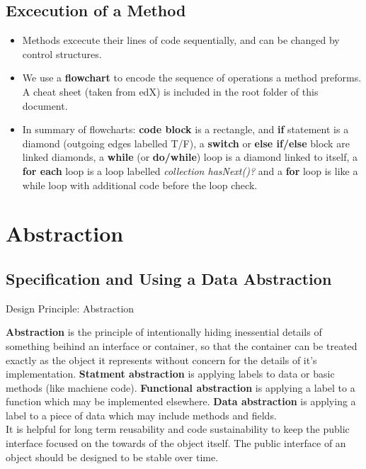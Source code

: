 \documentclass[letterpaper] {article}
\begin{document}
    \subsection{Excecution of a Method}
    \begin{itemize}
        \item Methods excecute their lines of code sequentially, and can be changed by control structures.
        \item We use a \textbf{flowchart} to encode the sequence of operations a method preforms. A cheat sheet (taken from edX) is included in the root folder of this document. 
        \item In summary of flowcharts: \textbf{code block} is a rectangle, and \textbf{if} statement is a diamond (outgoing edges labelled T/F), a \textbf{switch} or \textbf{else if/else} block are linked diamonds, a \textbf{while} (or \textbf{do/while}) loop is a diamond linked to itself, a \textbf{for each} loop is a loop labelled \textit{collection hasNext()?} and a \textbf{for} loop is like a while loop with additional code before the loop check. 
    \end{itemize}
    
    \newpage    
    \section{Abstraction}

    \subsection{Specification and Using a Data Abstraction}
    
    \begin{framed}
        \begin{center}
            Design Principle: Abstraction 
        \end{center}
        \textbf{Abstraction} is the principle of intentionally hiding inessential details of something beihind an interface or container, so that the container can be treated exactly as the object it represents without concern for the details of it's implementation. \textbf{Statment abstraction} is applying labels to data or basic methods (like machiene code). \textbf{Functional abstraction} is applying a label to a function which may be implemented elsewhere. \textbf{Data abstraction} is applying a label to a piece of data which may include methods and fields. \\

        It is helpful for long term reusability and code sustainability to keep the public interface focused on the towards of the object itself. The public interface of an object should be designed to be stable over time. 
    \end{framed}
\end{document}

